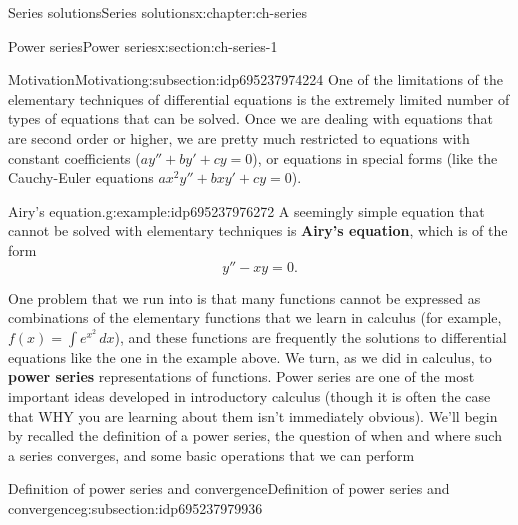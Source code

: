 \documentclass[oneside,10pt,]{book}
\newcommand{\terminology}[1]{\textbf{#1}}
\numberwithin{equation}{section}
\numberwithin{equation}{section}
\begin{document}
\begin{chapterptx}{Series solutions}{}{Series solutions}{}{}{x:chapter:ch-series}
%
%
\typeout{************************************************}
\typeout{************************************************}
%
\begin{sectionptx}{Power series}{}{Power series}{}{}{x:section:ch-series-1}
%
%
\typeout{************************************************}
\typeout{************************************************}
%
\begin{subsectionptx}{Motivation}{}{Motivation}{}{}{g:subsection:idp695237974224}
One of the limitations of the elementary techniques of differential equations is the extremely limited number of types of equations that can be solved. Once we are dealing with equations that are second order or higher, we are pretty much restricted to equations with constant coefficients (\(ay'' + by' + cy = 0\)), or equations in special forms (like the Cauchy-Euler equations \(ax^2y'' + bxy' + cy = 0\)).%
\begin{example}{Airy's equation.}{g:example:idp695237976272}%
A seemingly simple equation that cannot be solved with elementary techniques is \terminology{Airy's equation}, which is of the form%
\begin{equation*}
y'' - xy = 0.
\end{equation*}
%
\end{example}
One problem that we run into is that many functions cannot be expressed as combinations of the elementary functions that we learn in calculus (for example, \(f(x) = \int e^{x^2}\, dx\)), and these functions are frequently the solutions to differential equations like the one in the example above. We turn, as we did in calculus, to \terminology{power series} representations of functions. Power series are one of the most important ideas developed in introductory calculus (though it is often the case that WHY you are learning about them isn't immediately obvious). We'll begin by recalled the definition of a power series, the question of when and where such a series converges, and some basic operations that we can perform%
\end{subsectionptx}
%
%
\typeout{************************************************}
\typeout{************************************************}
%
\begin{subsectionptx}{Definition of power series and convergence}{}{Definition of power series and convergence}{}{}{g:subsection:idp695237979936}

\end{subsectionptx}
\end{sectionptx}
\end{chapterptx}
\end{document}
